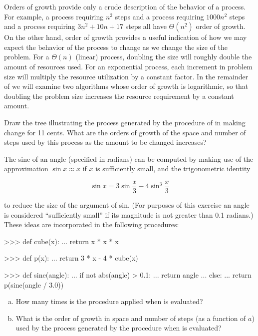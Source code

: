 Orders of growth provide only a crude description of the behavior of a process.
For example, a process requiring \( n^2 \) steps and a process requiring
\( 1000n^2 \) steps and a process requiring \( 3n^2 + 10n + 17 \) steps all
have \( \Theta(n^2) \) order of growth.  On the other hand, order of growth
provides a useful indication of how we may expect the behavior of the process
to change as we change the size of the problem.  For a \( \Theta(n) \)
(linear) process, doubling the size will roughly double the amount of resources
used.  For an exponential process, each increment in problem size will multiply
the resource utilization by a constant factor.  In the remainder of
 we will examine two algorithms whose order of growth is logarithmic,
so that doubling the problem size increases the resource requirement by a
constant amount.

\begin{exerciseGroup}
\label{Exercise 1.14}
 Draw the tree illustrating the
process generated by the  procedure of 
in making change for 11 cents.  What are the orders of growth of the space and
number of steps used by this process as the amount to be changed increases?

\label{Exercise 1.15}
 The sine of an angle (specified
in radians) can be computed by making use of the approximation
\mbox{\( \sin x \approx x \)} if \( x \) is sufficiently small, and the trigonometric
identity

$$\sin x = 3\sin \frac{x}{3} - 4\sin^3 \frac{x}{3} $$

\noindent
to reduce the size of the argument of sin.  (For purposes of this
exercise an angle is considered ``sufficiently small'' if its magnitude is not
greater than 0.1 radians.) These ideas are incorporated in the following
procedures:

\begin{codeBlock}
>>> def cube(x):
...     return x * x * x

>>> def p(x):
...     return 3 * x - 4 * cube(x)

>>> def sine(angle):
...     if not abs(angle) > 0.1:
...         return angle
...     else:
...         return p(sine(angle / 3.0))
\end{codeBlock}

\begin{enumerate}[a.]

\item
How many times is the procedure  applied when  is
evaluated?

\item
What is the order of growth in space and number of steps (as a function of
\( a \)) used by the process generated by the  procedure when
 is evaluated?

\end{enumerate}
\end{exerciseGroup}

